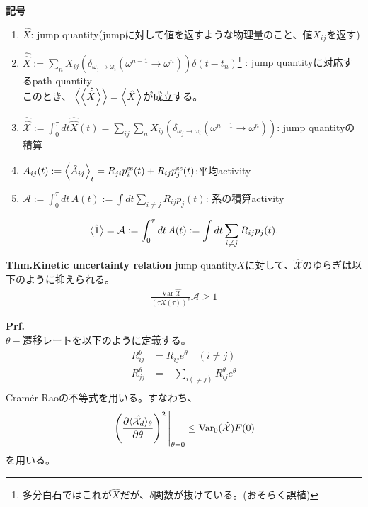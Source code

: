 \documentclass[a4paper,11pt]{jsarticle}
\numberwithin{equation}{section}
\begin{document}
\textbf{記号}
\begin{enumerate}
    \item $\hat{X}$: jump quantity(jumpに対して値を返すような物理量のこと、値$X_{ij}$を返す)
    \item $\hat{\hat{X}} := \sum_{n} X_{ij}(\delta_{\omega_j \to \omega_{i}}(\omega^{n-1} \to \omega^{n})) \delta(t-t_n)$\footnote{多分白石ではこれが$\hat{X}$だが、$\delta$関数が抜けている。(おそらく誤植)}
    : jump quantityに対応するpath quantity\\
    このとき、 $\ev{\ev{\hat{\hat{X}}}}= \ev{\hat{X}}$が成立する。
    \item $\hat{\hat{\mathcal{X}}} := \int_{0}^{\tau} dt \hat{\hat{X}}(t)= \sum_{ij}\sum_{n}X_{ij}(\delta_{\omega_j \to \omega_{i}}(\omega^{n-1} \to \omega^{n}))$: jump quantityの積算
    \item $ A_{ij}(t) := \expval{\hat{A}_{ij}}_t = R_{ji} p_i^{\text{ss}}(t) + R_{ij} p_j^{\text{ss}}(t)$:平均activity
    \item $\mathcal{A} := \int_{0}^{\tau} dt \, A(t) := \int dt \sum_{i \neq j} R_{ij} p_j(t)$: 系の積算activity
\end{enumerate}

\begin{align}
    \expval{\hat{1}} = \mathcal{A} := \int_{0}^{\tau} dt \, A(t) := \int dt \sum_{i \neq j} R_{ij} p_j(t).
\end{align}

\begin{itembox}[l]{\textbf{Thm.Kinetic uncertainty relation}}
    jump quantity$X$に対して、$\hat{\mathcal{X}}$のゆらぎは以下のように抑えられる。
    \begin{align}
        \frac{\operatorname{Var} \hat{\mathcal{X}}}{\left(\tau X(\tau)\right)^2} \mathcal{A} \geq 1
    \end{align}
\end{itembox}
\textbf{Prf.}\\
$\theta-$遷移レートを以下のように定義する。
\begin{align}
    R_{ij}^{\theta} &= R_{ij}e^{\theta } \quad (i \neq j)\\
    R_{jj}^{\theta} &= -\sum_{i (\neq j)} R_{ij}^{\theta}e^{\theta }\\
\end{align}
Cram\'er-Raoの不等式を用いる。すなわち、
\begin{align}
    \eval{\left( \frac{\partial \langle {\hat{\mathcal{X}}_{d}} \rangle_\theta}{\partial \theta} \right)^2}_{\theta = 0}
    \leq \mathrm{Var}_{0} (\hat{\mathcal{X}}) F(0) \label{eq:2}
    \end{align}
    を用いる。
\end{document}
